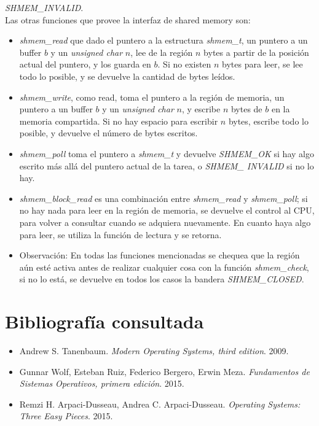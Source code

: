 \documentclass[a4paper]{article}
\begin{document}
\textit{SHMEM\_INVALID}. \\
Las otras funciones que provee la interfaz de shared memory son:
\begin{itemize}
    \item \textit{shmem\_read} que dado el puntero a la estructura
    \textit{shmem\_t}, un puntero a un buffer $b$ y un \textit{
    unsigned char} $n$, lee de la región $n$ bytes a partir de la
    posición actual del puntero, y los guarda en $b$. Si no
    existen $n$ bytes para leer, se lee todo lo posible, y se
    devuelve la cantidad de bytes le\'idos.
    \item \textit{shmem\_write}, como read, toma el puntero a la
    región de memoria, un puntero a un buffer $b$ y un \textit{
    unsigned char} $n$, y escribe $n$ bytes de $b$ en la memoria
    compartida. Si no hay espacio para escribir $n$ bytes,
    escribe todo lo posible, y devuelve el número de bytes
    escritos.
    \item \textit{shmem\_poll} toma el puntero a \textit{
    shmem\_t} y devuelve \textit{SHMEM\_OK} si hay algo escrito
    más allá del puntero actual de la tarea, o \textit{SHMEM\_
    INVALID} si no lo hay.
    \item \textit{shmem\_block\_read} es una combinación entre
    \textit{shmem\_read} y \textit{shmem\_poll}; si no hay nada
    para leer en la región de memoria, se devuelve el control
    al CPU, para volver a consultar cuando se adquiera
    nuevamente. En cuanto haya algo para leer, se utiliza la
    función de lectura y se retorna.
    \item Observación: En todas las funciones mencionadas se
    chequea que la región aún esté activa antes de realizar
    cualquier cosa con la función \textit{shmem\_check}, si
    no lo está, se devuelve en todos los casos la bandera
    \textit{SHMEM\_CLOSED}.
\end{itemize}


\section*{Bibliograf\'ia consultada}
\begin{itemize}
    \item Andrew S. Tanenbaum. \textit{Modern Operating Systems, third edition}. 2009.
    \item Gunnar Wolf, Esteban Ruiz, Federico Bergero, Erwin Meza.
    \textit{Fundamentos de Sistemas Operativos, primera edici\'on}. 2015.
    \item Remzi H. Arpaci-Dusseau, Andrea C. Arpaci-Dusseau. \textit{Operating Systems:
    Three Easy Pieces}. 2015. 
\end{itemize}
\end{document}
